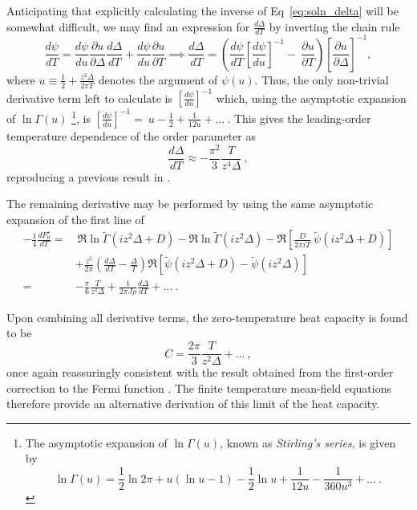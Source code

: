 Anticipating that explicitly calculating the inverse of Eq~\eqref{eq:soln_delta} will be somewhat difficult, we may find an expression for $ \frac{d \Delta}{d T} $ by inverting the chain rule $$ \frac{d \psi}{dT} = \frac{d \psi}{du} \frac{\partial u}{\partial \Delta} \frac{d \Delta}{d T} + \frac{d \psi}{du} \frac{\partial u}{\partial T} \implies \frac{d \Delta}{d T} = \left( \frac{d \psi}{dT} \left[ \frac{d \psi}{d u} \right]^{-1} - ~ \frac{\partial u}{\partial T} \right) \left[ \frac{\partial u}{\partial \Delta} \right]^{-1} ,$$ where $ u \equiv \frac{1}{2} + \frac{z^2 \Delta}{2 \pi T} $ denotes the argument of $ \psi(u) $. Thus, the only non-trivial derivative term left to calculate is $ \left[ \frac{d \psi}{d u} \right]^{-1} $ which, using the asymptotic expansion of $ \ln{\Gamma(u)} $ \footnote{The asymptotic expansion of $ \ln{\Gamma(u)} $, known as \textit{Stirling's series}, is given by \cite{MathematicalFunctions} $$ \ln{\Gamma(u)} = \frac{1}{2} \ln{2 \pi} + u (\ln{u} - 1) - \frac{1}{2} \ln{u} + \frac{1}{12u} - \frac{1}{360 u^3} + \ldots ~. $$}, is $ \left[ \frac{d \psi}{du} \right]^{-1} = ~ u - \frac{1}{2} + \frac{1}{12 u} + \ldots ~ . $ This gives the leading-order temperature dependence of the order parameter as
\begin{equation}
\frac{d \Delta}{d T} \approx - \frac{\pi^2}{3} \frac{T}{z^4 \Delta} ~ ,
\label{eq:delta_derivative}
\end{equation}
reproducing a previous result in \cite{Draft}.

The remaining derivative may be performed by using the same asymptotic expansion of the first line of
\begin{align*}
- \frac{1}{4} \frac{d F_{0}^{\star}}{dT} =& ~ \Re \ln{\widetilde{\Gamma}(i z^2 \Delta + D)} - \Re \ln{\widetilde{\Gamma}(i z^2 \Delta)} - \Re{\left[ \frac{D}{2 \pi i T} ~ \widetilde{\psi}(i z^2 \Delta + D) \right]} \\
& + \frac{z^2}{2 \pi} \left( \frac{d \Delta}{d T} - \frac{\Delta}{T} \right) \Re{\left[ \widetilde{\psi}(i z^2 \Delta + D) - \widetilde{\psi}(i z^2 \Delta) \right]} \\
=& - \frac{\pi}{6} \frac{T}{z^2 \Delta} + \frac{1}{2 \pi J \rho} \frac{d \Delta}{d T} + \ldots ~ .
\end{align*}

Upon combining all derivative terms, the zero-temperature heat capacity is found to be
\begin{equation}
C = \frac{2 \pi}{3} \frac{T}{z^2 \Delta} + \ldots ~ ,
\label{eq:heat_capacity}
\end{equation}
once again reassuringly consistent with the result obtained from the first-order correction to the Fermi function \cite{Draft}. The finite temperature mean-field equations therefore provide an alternative derivation of this limit of the heat capacity.

